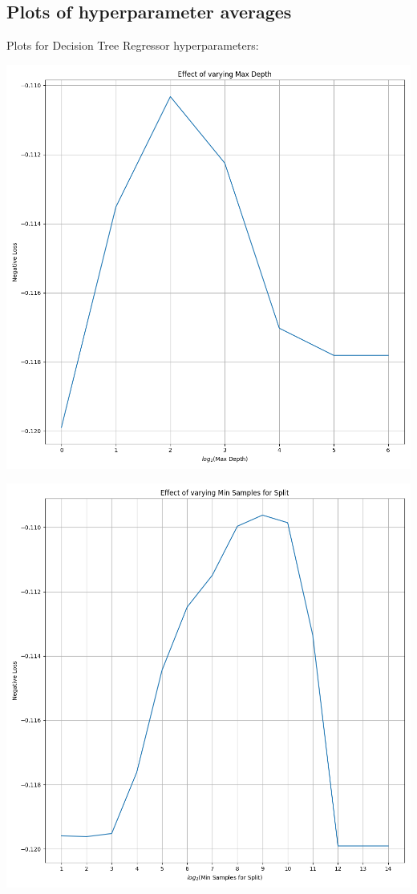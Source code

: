 \documentclass[12pt, letterpaper]{article}
\begin{document}
\subsection{Plots of hyperparameter averages}

\newcommand{\myscale}{0.4}

Plots for Decision Tree Regressor hyperparameters:

\includegraphics[scale=\myscale]{decision_tree_regressor_Max Depth.png}

\includegraphics[scale=\myscale]{decision_tree_regressor_Min Samples for Split.png}
\end{document}
